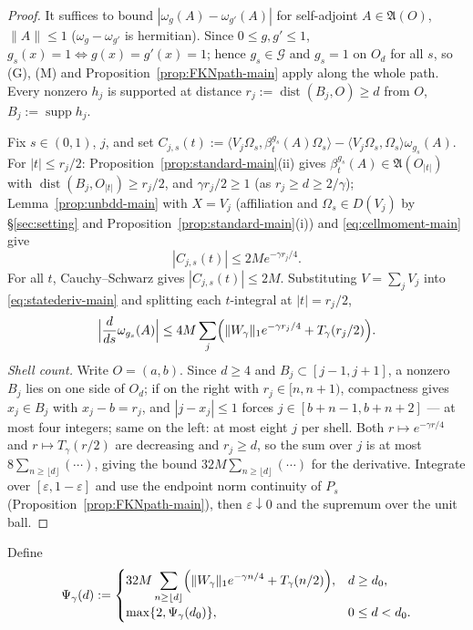 \documentclass[11pt,a4paper]{article}
\theoremstyle{plain}
\theoremstyle{definition}
\newcommand{\A}{\mathfrak{A}}
\newcommand{\G}{\mathcal{G}}
\newcommand{\Om}{\Omega}
\newcommand{\ip}[2]{\langle #1,#2\rangle}
\DeclareMathOperator{\supp}{supp}
\DeclareMathOperator{\dist}{dist}
\begin{document}
\begin{proof}
It suffices to bound $|\omega_g(A)-\omega_{g'}(A)|$ for self-adjoint $A\in\A(O)$, $\|A\|\le1$
($\omega_g-\omega_{g'}$ is hermitian). Since $0\le g,g'\le1$,
$g_s(x)=1\Leftrightarrow g(x)=g'(x)=1$; hence $g_s\in\G$ and $g_s=1$ on $O_d$ for all $s$, so
\textup{(G)}, \textup{(M)} and Proposition~\ref{prop:FKNpath-main} apply along the whole path.
Every nonzero $h_j$ is supported at distance $r_j:=\dist(B_j,O)\ge d$ from $O$,
$B_j:=\supp h_j$.

Fix $s\in(0,1)$, $j$, and set
$C_{j,s}(t):=\ip{V_j\Om_s}{\beta^{g_s}_t(A)\Om_s}-\ip{V_j\Om_s}{\Om_s}\omega_{g_s}(A)$.
For $|t|\le r_j/2$: Proposition~\ref{prop:standard-main}(ii) gives
$\beta^{g_s}_t(A)\in\A(O_{|t|})$ with $\dist(B_j,O_{|t|})\ge r_j/2$, and
$\gamma r_j/2\ge1$ (as $r_j\ge d\ge2/\gamma$); Lemma~\ref{prop:unbdd-main} with $X=V_j$
(affiliation and $\Om_s\in D(V_j)$ by \S\ref{sec:setting} and
Proposition~\ref{prop:standard-main}(i)) and \eqref{eq:cellmoment-main} give
\begin{equation}\label{eq:near-main}
  |C_{j,s}(t)|\le2Me^{-\gamma r_j/4}.
\end{equation}
For all $t$, Cauchy--Schwarz gives $|C_{j,s}(t)|\le2M$. Substituting $V=\sum_jV_j$ into
\eqref{eq:statederiv-main} and splitting each $t$-integral at $|t|=r_j/2$,
\[
  \Bigl|\frac d{ds}\omega_{g_s}(A)\Bigr|
  \le4M\sum_j\Bigl(\|W_\gamma\|_1e^{-\gamma r_j/4}+T_\gamma(r_j/2)\Bigr).
\]
\emph{Shell count.} Write $O=(a,b)$. Since $d\ge4$ and $B_j\subset[j-1,j+1]$, a nonzero $B_j$
lies on one side of $O_d$; if on the right with $r_j\in[n,n+1)$, compactness gives $x_j\in B_j$
with $x_j-b=r_j$, and $|j-x_j|\le1$ forces $j\in[b+n-1,b+n+2]$ --- at most four integers; same
on the left: at most eight $j$ per shell. Both $r\mapsto e^{-\gamma r/4}$ and
$r\mapsto T_\gamma(r/2)$ are decreasing and $r_j\ge d$, so the sum over $j$ is at most
$8\sum_{n\ge\lfloor d\rfloor}(\cdots)$, giving the bound $32M\sum_{n\ge\lfloor d\rfloor}(\cdots)$
for the derivative. Integrate over $[\varepsilon,1-\varepsilon]$ and use the endpoint norm
continuity of $P_s$ (Proposition~\ref{prop:FKNpath-main}), then $\varepsilon\downarrow0$ and the
supremum over the unit ball.
\end{proof}

Define
\begin{equation}\label{eq:Psi-main}
 \Psi_\gamma(d):=
 \begin{cases}
  \displaystyle 32M\sum_{n\ge\lfloor d\rfloor}
  \Bigl(\|W_\gamma\|_1e^{-\gamma n/4}+T_\gamma(n/2)\Bigr),&d\ge d_0,\\[6pt]
  \max\{2,\Psi_\gamma(d_0)\},&0\le d<d_0.
 \end{cases}
\end{equation}
\end{document}
